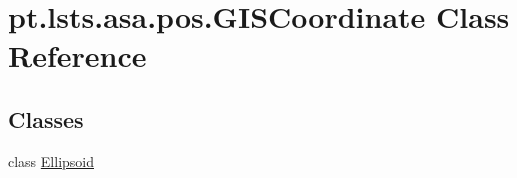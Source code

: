 \hypertarget{classpt_1_1lsts_1_1asa_1_1pos_1_1GISCoordinate}{}\section{pt.\+lsts.\+asa.\+pos.\+G\+I\+S\+Coordinate Class Reference}
\label{classpt_1_1lsts_1_1asa_1_1pos_1_1GISCoordinate}
\subsection*{Classes}
\begin{DoxyCompactItemize}
\item 
class \hyperlink{classpt_1_1lsts_1_1asa_1_1pos_1_1GISCoordinate_1_1Ellipsoid}{Ellipsoid}
\end{DoxyCompactItemize}
